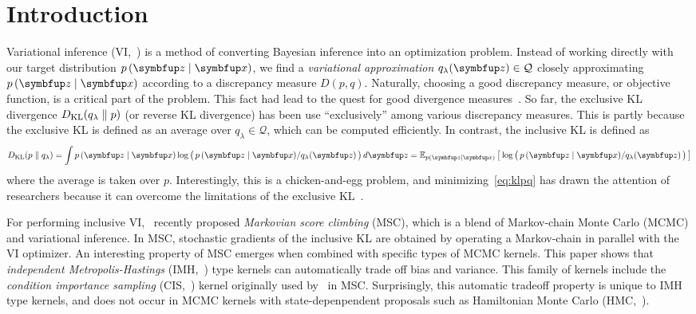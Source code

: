 
\section{Introduction}
Variational inference (VI,~\citealt{jordan_introduction_1999, blei_variational_2017}) is a method of converting Bayesian inference into an optimization problem.
Instead of working directly with our target distribution \(p\,(\vz\mid\vx)\), we find a \textit{variational approximation} \(q_{\lambda}(\vz) \in \mathcal{Q}\) closely approximating \(p\,(\vz\mid\vx)\) according to a discrepancy measure \(D(p, q)\).
Naturally, choosing a good discrepancy measure, or objective function, is a critical part of the problem.
This fact had lead to the quest for good divergence measures~\citep{NIPS2016_7750ca35, NIPS2017_35464c84, pmlr-v97-ruiz19a}.
So far, the exclusive KL divergence \(D_{\mathrm{KL}}(q_{\lambda}\parallel p)\) (or reverse KL divergence) has been use ``exclusively'' among various discrepancy measures.
This is partly because the exclusive KL is defined as an average over \(q_{\lambda} \in \mathcal{Q}\), which can be computed efficiently.
In contrast, the inclusive KL is defined as
%
\begin{align}
  \DKL{p}{q_{\lambda}} = \int p\,(\vz\mid\vx) \log\big(\, p\,(\vz\mid\vx)/q_{\lambda}(\vz) \,\big)\,d\vz
  = \Esub{p(\vz\mid\vx)}{\log\big(\, p\,(\vz\mid\vx)/q_{\lambda}(\vz) \,\big) } \label{eq:klpq}
\end{align}
%
where the average is taken over \(p\).%
Interestingly, this is a chicken-and-egg problem, and minimizing~\eqref{eq:klpq} has drawn the attention of researchers because it can overcome the limitations of the exclusive KL~\citep{minka2005divergence, mackay_local_2001}.

For performing inclusive VI,~\citet{NEURIPS2020_b2070693, pmlr-v124-ou20a} recently proposed \textit{Markovian score climbing} (MSC), which is a blend of Markov-chain Monte Carlo (MCMC) and variational inference.
In MSC, stochastic gradients of the inclusive KL are obtained by operating a Markov-chain in parallel with the VI optimizer.
An interesting property of MSC emerges when combined with specific types of MCMC kernels.
This paper shows that \textit{independent Metropolis-Hastings} (IMH,~\citealt{robert_monte_2004}) type kernels can automatically trade off bias and variance.
This family of kernels include the \textit{condition importance sampling} (CIS,~\citealt{NEURIPS2020_b2070693}) kernel originally used by~\citeauthor{NEURIPS2020_b2070693} in MSC.
Surprisingly, this automatic tradeoff property is unique to IMH type kernels, and does not occur in MCMC kernels with state-depenpendent proposals such as Hamiltonian Monte Carlo (HMC,~\citealt{duane_hybrid_1987, neal_mcmc_2011, betancourt_conceptual_2017}).


